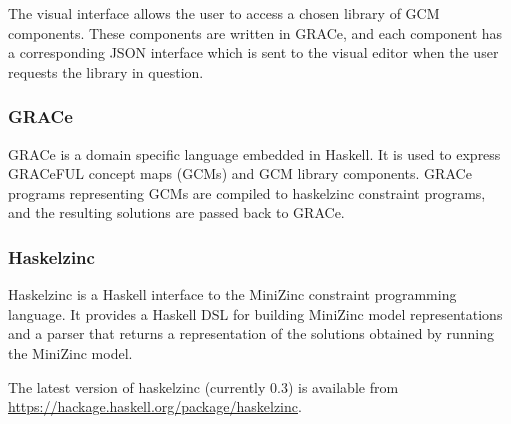The visual interface allows the user to access a chosen library of GCM
components.
%
These components are written in GRACe, and each component has a
corresponding JSON interface which is sent to the visual editor when
the user requests the library in question.

\subsubsection*{GRACe}

GRACe is a domain specific language embedded in Haskell.
%
It is used to express GRACeFUL concept maps (GCMs) and GCM library
components.
%
GRACe programs representing GCMs are compiled to haskelzinc constraint
programs, and the resulting solutions are passed back to GRACe.

\subsubsection*{Haskelzinc}

Haskelzinc is a Haskell interface to the MiniZinc constraint
programming language.
%
It provides a Haskell DSL for building MiniZinc model representations and a parser that returns a representation of the solutions obtained
by running the MiniZinc model.

The latest version of haskelzinc (currently 0.3) is available from
\url{https://hackage.haskell.org/package/haskelzinc}.

